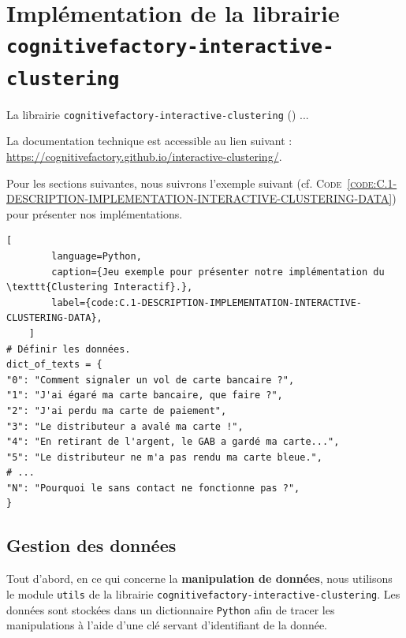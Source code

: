 \section[
		\texttt{cognitivefactory-interactive-clustering}
	]{
		Implémentation de la librairie \\ \texttt{cognitivefactory-interactive-clustering}
	}
\label{annex:C.1-DESCRIPTION-IMPLEMENTATION-INTERACTIVE-CLUSTERING}
	
	La librairie \texttt{cognitivefactory-interactive-clustering} (\cite{schild:2022:cognitivefactory-interactiveclustering}) ...
	
	\begin{leftBarInformation}
		La documentation technique est accessible au lien suivant : \url{https://cognitivefactory.github.io/interactive-clustering/}.
	\end{leftBarInformation}
	
	Pour les sections suivantes, nous suivrons l'exemple suivant (cf. \textsc{Code~\ref{code:C.1-DESCRIPTION-IMPLEMENTATION-INTERACTIVE-CLUSTERING-DATA}}) pour présenter nos implémentations.
	
	\begin{lstlisting}[
		language=Python,
		caption={Jeu exemple pour présenter notre implémentation du \texttt{Clustering Interactif}.},
		label={code:C.1-DESCRIPTION-IMPLEMENTATION-INTERACTIVE-CLUSTERING-DATA},
	]
# Définir les données.
dict_of_texts = {
"0": "Comment signaler un vol de carte bancaire ?",
"1": "J'ai égaré ma carte bancaire, que faire ?",
"2": "J'ai perdu ma carte de paiement",
"3": "Le distributeur a avalé ma carte !",
"4": "En retirant de l'argent, le GAB a gardé ma carte...",
"5": "Le distributeur ne m'a pas rendu ma carte bleue.",
# ...
"N": "Pourquoi le sans contact ne fonctionne pas ?",
}
	\end{lstlisting}
	
	
	\subsection{Gestion des données}
	\label{annex:C.1.1-DESCRIPTION-IMPLEMENTATION-INTERACTIVE-CLUSTERING-GESTION-DES-DONNEES}
	
	Tout d'abord, en ce qui concerne la \textbf{manipulation de données}, nous utilisons le module \texttt{utils} de la librairie \texttt{cognitivefactory-interactive-clustering}.
	Les données sont stockées dans un dictionnaire \texttt{Python} afin de tracer les manipulations à l'aide d'une clé servant d'identifiant de la donnée.
	
